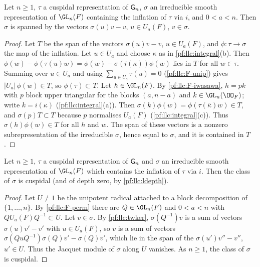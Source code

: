 \begin{lemma}\label{pf:llc:twker}
Let $n\ge1$, $\tau$ a cuspidal representation of $\mathsf{G}_n$, $\sigma$ an irreducible smooth representation of
$\GL_n(F)$ containing the inflation of $\tau$ via $i$, and $0<a<n$. Then $\sigma$ is spanned by the vectors
$\sigma(u)v-v$, $u\in U_a(F)$, $v\in\sigma$. 
\end{lemma}

\begin{proof}
Let $T$ be the span of the vectors $\sigma(u)v-v$, $u\in U_a(F)$, and $\phi\colon\tau\to\sigma$ the map of the
inflation. Let $u\in U_a$ and choose $\kappa$ as in \cref{pf:llc:integral}(b). Then
$\phi(w)-\phi(\tau(u)w)=\phi(w)-\sigma(i(\kappa))\phi(w)$ lies in $T$ for all $w\in\tau$. Summing over $u\in U_a$ and
using $\sum_{u\in U_a}\tau(u)=0$ (\ref{pf:llc:F-unip}) gives $|U_a|\,\phi(w)\in T$, so $\phi(\tau)\subset T$. Let
$h\in\GL_n(F)$. By \ref{pf:llc:F-iwasawa}, $h=pk$ with $p$ block upper triangular for the blocks $(a,n-a)$ and
$k\in\GL_n(\OO_F)$; write $k=i(\kappa)$ (\cref{pf:llc:integral}(a)). Then
$\sigma(k)\phi(w)=\phi(\tau(\bar\kappa)w)\in T$, and $\sigma(p)T\subset T$ because $p$ normalises $U_a(F)$
(\cref{pf:llc:integral}(c)). Thus $\sigma(h)\phi(w)\in T$ for all $h$ and $w$. The span of these vectors is a
nonzero subrepresentation of the irreducible $\sigma$, hence equal to $\sigma$, and it is contained in $T$.
\end{proof}


\begin{proposition}\label{pf:llc:cuspinfl}
Let $n\ge1$, $\tau$ a cuspidal representation of $\mathsf{G}_n$ and $\sigma$ an irreducible smooth representation of
$\GL_n(F)$ which contains the inflation of $\tau$ via $i$. Then the class of $\sigma$ is cuspidal (and of
depth zero, by \cref{pf:llc:ldepth}). 
\end{proposition}

\begin{proof}
Let $U\ne1$ be the unipotent radical attached to a block decomposition of $\{1,\dots,n\}$. By
\ref{pf:llc:F-perm} there are $Q\in\GL_n(F)$ and $0<a<n$ with $QU_a(F)Q^{-1}\subset U$. Let $v\in\sigma$. By
\cref{pf:llc:twker}, $\sigma(Q^{-1})v$ is a sum of vectors $\sigma(u)v'-v'$ with $u\in U_a(F)$, so $v$ is a sum of
vectors $\sigma(QuQ^{-1})\sigma(Q)v'-\sigma(Q)v'$, which lie in the span of the $\sigma(u')v''-v''$, $u'\in U$. Thus the
Jacquet module of $\sigma$ along $U$ vanishes. As $n\ge1$, the class of $\sigma$ is cuspidal.
\end{proof}


